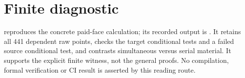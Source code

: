 \documentclass{article}
\begin{document}
\section{Finite diagnostic}
 reproduces the concrete paid-face calculation; its recorded output is . It retains all 441 dependent raw points, checks the target conditional tests and a failed source conditional test, and contrasts simultaneous versus serial material. It supports the explicit finite witness, not the general proofs. No compilation, formal verification or CI result is asserted by this reading route.
\end{document}
